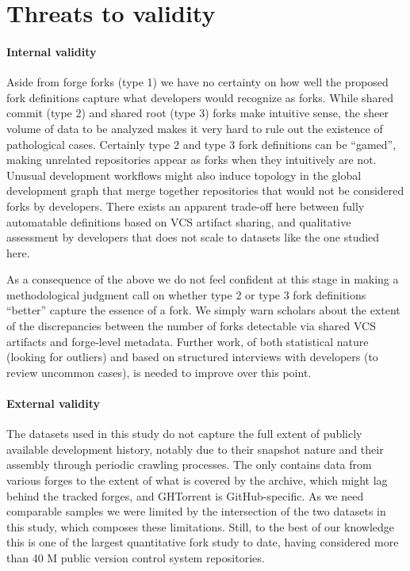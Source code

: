 \section{Threats to validity}%
\label{sec:forks-threats}

\paragraph{Internal validity}
Aside from forge forks (type 1) we have no certainty on how well the proposed
fork definitions capture what developers would recognize as forks. While shared
commit (type 2) and shared root (type 3) forks make intuitive sense, the sheer
volume of data to be analyzed makes it very hard to rule out the existence of
pathological cases. Certainly type 2 and type 3 fork definitions can be
``gamed'', making unrelated repositories appear as forks when they intuitively
are not. Unusual development workflows might also induce topology in the global
development graph that merge together repositories that would not be considered
forks by developers. There exists an apparent trade-off here between fully
automatable definitions based on VCS artifact sharing, and qualitative
assessment by developers that does not scale to datasets like the one studied
here.

As a consequence of the above we do not feel confident at this stage in
making a methodological judgment call on whether type 2 or type 3 fork
definitions ``better'' capture the essence of a fork. We simply warn scholars
about the extent of the discrepancies between the number of forks detectable
via shared VCS artifacts and forge-level metadata. Further work, of both
statistical nature (looking for outliers) and based on structured interviews
with developers (to review uncommon cases), is needed to improve over this
point.

\paragraph{External validity}
The datasets used in this study do not capture the full extent of publicly
available development history, notably due to their snapshot nature and their
assembly through periodic crawling processes. The \SWHGD{} only contains data
from various forges to the extent of what is covered by the \SWH{} archive,
which might lag behind the tracked forges, and GHTorrent is GitHub-specific. As
we need comparable samples we were limited by the intersection of the two
datasets in this study, which composes these limitations. Still, to the best of
our knowledge this is one of the largest quantitative fork study to date,
having considered more than 40 M public version control system repositories.

